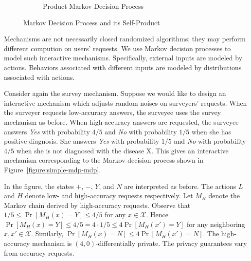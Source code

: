 \begin{figure}
\begin{subfigure}{.58\columnwidth}
{{
}
    }
    \caption{Product Markov Decision Process}
    \label{figure:simple-mdp-product}
  \end{subfigure}
  \caption{Markov Decision Process and its Self-Product}
  \label{figure:simple-mdp}
\end{figure}

Mechanisms are not necessarily closed randomized algorithms; they may
perform different compution on users' requests.
We use Markov decision processes to model such
interactive mechanisms. Specifically, external inputs are modeled by
actions. Behaviors associated with different inputs are modeled by
distributions associated with actions.

Consider again the survey mechanism. Suppose we would like to design
an interactive mechanism which adjusts random noises on surveyers'
requests. When the surveyer requests low-accuracy answers, the
surveyee uses the survey mechanism as before. When high-accuracy
answers are requested, the surveyee answers \textit{Yes} with
probability $4/5$ and \textit{No} with probability $1/5$ when she has
positive diagnosis. She answers \textit{Yes} with probability $1/5$
and \textit{No} with probability $4/5$ when she is not
diagnosed with the disease X. This gives an interactive mechanism
corresponding to the Markov decision process shown in
Figure~\ref{figure:simple-mdp-mdp}.

In the figure, the states $+$,
$-$, $Y$, and $N$ are interpreted as before. The actions $L$ and $H$
denote low- and high-accuracy requests respectively. Let $M_H$ denote
the Markov chain derived by high-accuracy requests.
Observe that $1/5 \leq \Pr[M_H(x) = Y] \leq 4/5$ for any $x
\in \mathcal{X}$. Hence $\Pr[M_H (x) = Y] \leq 4/5 = 4 \cdot 1/5 \leq
4 \Pr[M_H (x') = Y]$ for any neighboring $x, x' \in
\mathcal{X}$. Similarly, $\Pr[M_H (x) = N] \leq 4 \Pr[M_H (x') =
N]$. The high-accuracy mechanism is $(4,0)$-differentially private.
The privacy guarantees vary from accuracy requests.

